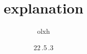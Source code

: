 \documentclass[11pt,twoside,a4paper]{article}
\begin{document}
    \title{explanation}
    \author{olxh}
    \date{22\,.5\,.3}

    
\end{document}
